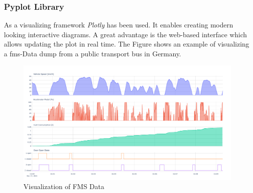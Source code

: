 \subsubsection{Pyplot Library}
As a visualizing framework \textit{Plotly} has been used. It enables creating modern looking interactive diagrams. A great advantage is the web-based interface which allows updating the plot in real time. The Figure shows an example of visualizing a \acrshort{fms}-Data dump from a public transport bus in Germany.

\begin{figure}[h!]
	\centering
	\hfuzz=15.0pt
	\includegraphics[width=\textwidth]{images/FMS_Data_Visualization.pdf}
	\caption{Visualization of FMS Data}
	\label{fig:fms_visualization}
\end{figure}
\newpage
